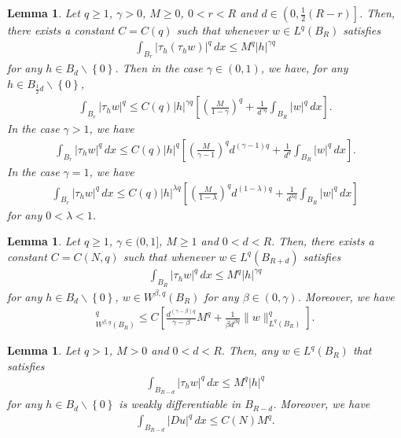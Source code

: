\documentclass[reqno,10pt]{amsart}
\numberwithin{equation}{section}
\newtheorem{lemma}[theorem]{Lemma}
\begin{document}
\begin{lemma}
	\label{lem6}
	Let $q\ge1$, $\gamma>0$, $M\ge0$, $0<r<R$ and $d\in \left( 0,\frac{1}{2}(R-r)\right] $. Then, there exists a constant $C=C(q)$ such that whenever $w\in L^q(B_R)$ satisfies
	\begin{align*}
		\int_{B_r}|\tau_h(\tau_hw)|^q\,dx\le M^q|h|^{\gamma q}
	\end{align*}
	for any $h\in B_d\backslash \left\lbrace 0\right\rbrace $. Then in the case $\gamma\in (0,1)$, we have, for any $h\in B_{\frac{1}{2}d}\backslash\left\lbrace 0\right\rbrace $,
	\begin{align*}
		\int_{B_r}|\tau_hw|^q\le C(q)|h|^{\gamma q}\left[ \left( \frac{M}{1-\gamma}\right)^q+\frac{1}{d^{\gamma q}}\int_{B_R}|w|^q\,dx \right].
	\end{align*}
	In the case $\gamma>1$, we have
	\begin{align*}
		\int_{B_r}|\tau_hw|^q\,dx\le C(q)|h|^q\left[ \left( \frac{M}{\gamma-1}\right)^qd^{(\gamma-1)q}+\frac{1}{d^q}\int_{B_R}|w|^q\,dx \right].
	\end{align*}
	In the case $\gamma=1$, we have
	\begin{align*}
		\int_{B_r}|\tau_hw|^q\,dx\le C(q)|h|^{\lambda q}\left[ \left( \frac{M}{1-\lambda}\right)^qd^{(1-\lambda)q}+\frac{1}{d^{\lambda q}}\int_{B_R}|w|^q\,dx \right] 
	\end{align*}
	for any $0<\lambda<1$.
\end{lemma}

\begin{lemma}
	\label{lem7}
	Let $q\ge1$, $\gamma\in (0,1]$, $M\ge1$ and $0<d<R$. Then, there exists a constant $C=C(N,q)$ such that whenever $w\in L^q(B_{R+d})$ satisfies
	\begin{align*}
		\int_{B_R}|\tau_hw|^q\,dx\le M^q|h|^{\gamma q}
	\end{align*}
	for any $h\in B_d\backslash\left\lbrace 0\right\rbrace $, $w\in W^{\beta,q}(B_R)$ for any $\beta\in (0,\gamma)$. Moreover, we have
	\begin{align*}
		[w]^q_{W^{\beta,q}(B_R)}\le C\left[ \frac{d^{(\gamma-\beta)q}}{\gamma-\beta}M^q+\frac{1}{\beta d^{\beta q}}\|w\|^q_{L^q(B_R)}\right]. 
	\end{align*}
\end{lemma}

\begin{lemma}
	\label{lem16}
	Let $q>1$, $M>0$ and $0<d<R$. Then, any $w\in L^q(B_R)$ that satisfies
	\begin{align*}
		\int_{B_{R-d}}|\tau_hw|^q\,dx\le M^q|h|^q
	\end{align*}
	for any $h\in B_d\backslash \left\lbrace 0\right\rbrace $ is weakly differentiable in $B_{R-d}$. Moreover, we have
	\begin{align*}
		\int_{B_{R-d}}|Du|^q\,dx\le C(N)M^q.
	\end{align*} 
\end{lemma}
\end{document}
